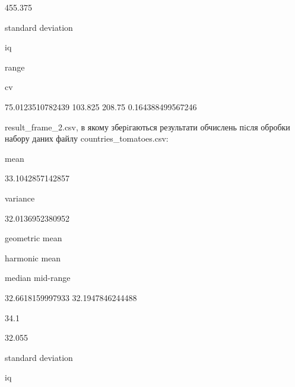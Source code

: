 \documentclass[a4paper,portrait,12pt]{article}
\begin{document}
455.375


\begin{flushleft}
standard deviation
\end{flushleft}


\begin{flushleft}
iq
\end{flushleft}


\begin{flushleft}
range
\end{flushleft}


\begin{flushleft}
cv
\end{flushleft}


75.0123510782439 103.825 208.75 0.164388499567246





\begin{flushleft}
result\_frame\_2.csv, в якому зберiгаються результати обчислень пiсля обробки набору даних файлу countries\_tomatoes.csv:
\end{flushleft}


\begin{flushleft}
mean
\end{flushleft}


33.1042857142857


\begin{flushleft}
variance
\end{flushleft}


32.0136952380952





\begin{flushleft}
geometric mean
\end{flushleft}


\begin{flushleft}
harmonic mean
\end{flushleft}


\begin{flushleft}
median mid-range
\end{flushleft}


32.6618159997933 32.1947846244488


34.1


32.055


\begin{flushleft}
standard deviation
\end{flushleft}


\begin{flushleft}
iq
\end{flushleft}
\end{document}

